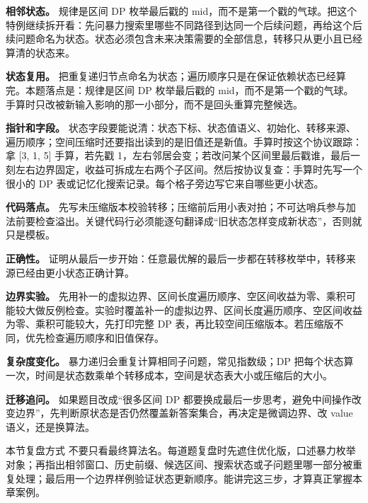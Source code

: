 \textbf{相邻状态。} 规律是区间 DP 枚举最后戳的 mid，而不是第一个戳的气球。把这个特例继续拆开看：先问暴力搜索里哪些不同路径到达同一个后续问题，再给这个后续问题命名为状态。状态必须包含未来决策需要的全部信息，转移只从更小且已经算清的状态来。

\textbf{状态复用。} 把重复递归节点命名为状态；遍历顺序只是在保证依赖状态已经算完。本题落点是：规律是区间 DP 枚举最后戳的 mid，而不是第一个戳的气球。手算时只改被新输入影响的那一小部分，而不是回头重算完整候选。

\textbf{指针和字段。} 状态字段要能说清：状态下标、状态值语义、初始化、转移来源、遍历顺序；空间压缩时还要指出读到的是旧值还是新值。手算时按这个协议跟踪：拿 [3, 1, 5] 手算，若先戳 1，左右邻居会变；若改问某个区间里最后戳谁，最后一刻左右边界固定，收益可拆成左右两个子区间。然后按协议复查：手算时先写一个很小的 DP 表或记忆化搜索记录。每个格子旁边写它来自哪些更小状态。

\textbf{代码落点。} 先写未压缩版本校验转移；压缩前后用小表对拍；不可达哨兵参与加法前要检查溢出。关键代码行必须能逐句翻译成“旧状态怎样变成新状态”，否则就只是模板。

\textbf{正确性。} 证明从最后一步开始：任意最优解的最后一步都在转移枚举中，转移来源已经由更小状态正确计算。

\textbf{边界实验。} 先用补一的虚拟边界、区间长度遍历顺序、空区间收益为零、乘积可能较大做反例检查。实验时覆盖补一的虚拟边界、区间长度遍历顺序、空区间收益为零、乘积可能较大，先打印完整 DP 表，再比较空间压缩版本。若压缩版不同，优先检查遍历顺序和旧值保存。

\textbf{复杂度变化。} 暴力递归会重复计算相同子问题，常见指数级；DP 把每个状态算一次，时间是状态数乘单个转移成本，空间是状态表大小或压缩后的大小。

\textbf{迁移追问。} 如果题目改成“很多区间 DP 都要换成最后一步思考，避免中间操作改变边界”，先判断原状态是否仍然覆盖新答案集合，再决定是微调边界、改 value 语义，还是换算法。

\begin{principlebox}{本节复盘方式}
不要只看最终算法名。每道题复盘时先遮住优化版，口述暴力枚举对象；再指出相邻窗口、历史前缀、候选区间、搜索状态或子问题里哪一部分被重复处理；最后用一个边界样例验证状态更新顺序。能讲完这三步，才算真正掌握本章案例。
\end{principlebox}

